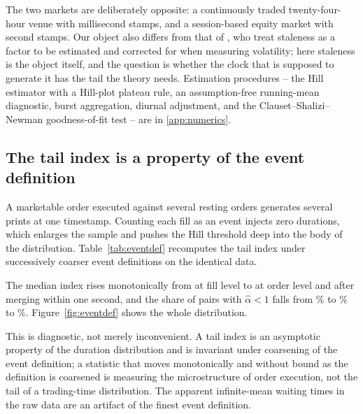 \documentclass{ws-ijtaf}
\begin{document}
The two markets are deliberately opposite: a continuously traded
twenty-four-hour venue with millisecond stamps, and a session-based equity
market with second stamps. Our object also differs from that of \citet{kon26},
who treat staleness as a factor to be estimated and corrected for when measuring
volatility; here staleness is the object itself, and the question is whether the
clock that is supposed to generate it has the tail the theory needs. Estimation procedures -- the Hill estimator
\citep{hil75} with a Hill-plot plateau rule, an assumption-free running-mean
diagnostic, burst aggregation, diurnal adjustment, and the
Clauset--Shalizi--Newman goodness-of-fit test \citep{cla09} -- are in
\ref{app:numerics}.

\subsection{The tail index is a property of the event definition}

A marketable order executed against several resting orders generates several
prints at one timestamp. Counting each fill as an event injects zero durations,
which enlarges the sample and pushes the Hill threshold deep into the body of
the distribution. Table~\ref{tab:eventdef} recomputes the tail index under
successively coarser event definitions on the identical data.

\begin{table}[t]
{}
\label{tab:eventdef}
\end{table}

The median index rises monotonically from \cryptoAlphaFillMed{} at fill level to
\cryptoAlphaOrderMed{} at order level and \cryptoAlphaWbMed{} after merging
within one second, and the share of pairs with $\hat\alpha<1$ falls from
\cryptoAlphaFillFrac{}\% to \cryptoAlphaOrderFrac{}\% to
\cryptoAlphaWbFrac{}\%. Figure~\ref{fig:eventdef} shows the whole distribution.

This is diagnostic, not merely inconvenient. A tail index is an asymptotic
property of the duration distribution and is invariant under coarsening of the
event definition; a statistic that moves monotonically and without bound as the
definition is coarsened is measuring the microstructure of order execution, not
the tail of a trading-time distribution. The apparent infinite-mean waiting
times in the raw data are an artifact of the finest event definition.
\end{document}
